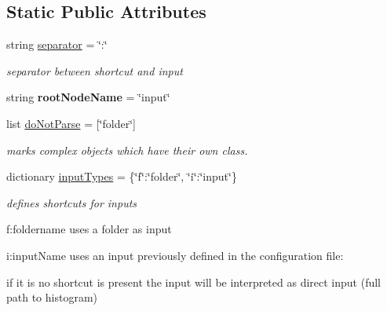 \subsection*{Static Public Attributes}
\begin{CompactItemize}
\item 
\hypertarget{classtools_1_1XMLConfigParser_1_1Input_6a1fe6d410ed958cede99812e070212f}{
string \hyperlink{classtools_1_1XMLConfigParser_1_1Input_6a1fe6d410ed958cede99812e070212f}{separator} = \char`\"{}:\char`\"{}}
\label{classtools_1_1XMLConfigParser_1_1Input_6a1fe6d410ed958cede99812e070212f}

\begin{CompactList}\small\item\em separator between shortcut and input \item\end{CompactList}\item 
\hypertarget{classtools_1_1XMLConfigParser_1_1Input_06abafad4788d8027a19cdf2f2819940}{
string \textbf{rootNodeName} = \char`\"{}input\char`\"{}}
\label{classtools_1_1XMLConfigParser_1_1Input_06abafad4788d8027a19cdf2f2819940}

\item 
list \hyperlink{classtools_1_1XMLConfigParser_1_1Input_02daa3ad92bdc203274e117a88ec8543}{doNotParse} = \mbox{[}\char`\"{}folder\char`\"{}\mbox{]}
\begin{CompactList}\small\item\em marks complex objects which have their own class. \item\end{CompactList}\item 
\hypertarget{classtools_1_1XMLConfigParser_1_1Input_d96187f7a89c6b7879473eb102622375}{
dictionary \hyperlink{classtools_1_1XMLConfigParser_1_1Input_d96187f7a89c6b7879473eb102622375}{inputTypes} = \{\char`\"{}f\char`\"{}:\char`\"{}folder\char`\"{}, \char`\"{}i\char`\"{}:\char`\"{}input\char`\"{}\}}
\label{classtools_1_1XMLConfigParser_1_1Input_d96187f7a89c6b7879473eb102622375}

\begin{CompactList}\small\item\em defines shortcuts for inputs \par
 f:foldername uses a folder as input\par
 i:inputName uses an input previously defined in the configuration file:\par
 if it is no shortcut is present the input will be interpreted as direct input (full path to histogram) \item\end{CompactList}\end{CompactItemize}


